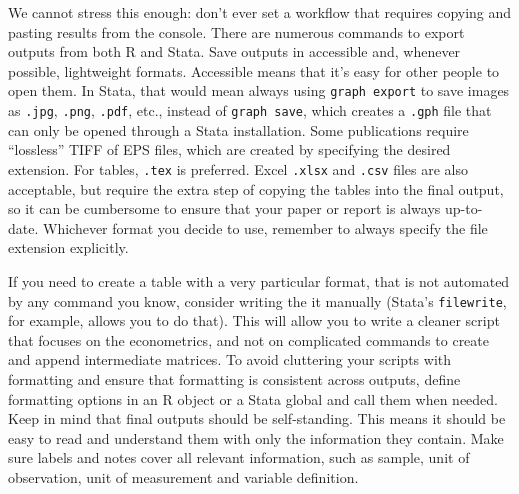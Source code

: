 We cannot stress this enough: don't ever set a workflow that requires copying and pasting results from the console.
There are numerous commands to export outputs from both R and Stata.
Save outputs in accessible and, whenever possible, lightweight formats.
Accessible means that it's easy for other people to open them.
In Stata, that would mean always using \texttt{graph export} to save images as \texttt{.jpg}, \texttt{.png}, \texttt{.pdf}, etc., 
instead of \texttt{graph save}, which creates a \texttt{.gph} file that can only be opened through a Stata installation.
Some publications require ``lossless'' TIFF of EPS files, which are created by specifying the desired extension.
For tables, \texttt{.tex} is preferred. 
Excel \texttt{.xlsx} and \texttt{.csv} files are also acceptable, but require the extra step of copying the tables into the final output, so it can be cumbersome to ensure that your paper or report is always up-to-date.
Whichever format you decide to use, remember to always specify the file extension explicitly.

If you need to create a table with a very particular format, that is not automated by any command you know, consider writing the it manually 
(Stata's \texttt{filewrite}, for example, allows you to do that).
This will allow you to write a cleaner script that focuses on the econometrics, and not on complicated commands to create and append intermediate matrices.
To avoid cluttering your scripts with formatting and ensure that formatting is consistent across outputs,
define formatting options in an R object or a Stata global and call them when needed.
Keep in mind that final outputs should be self-standing.
This means it should be easy to read and understand them with only the information they contain.
Make sure labels and notes cover all relevant information, such as sample, unit of observation, unit of measurement and variable definition.



